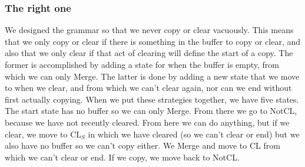 \documentclass[12pt]{article}
\theoremstyle{definition}
\begin{document}









\subsubsection{The right one}
\label{sec:right-one}

We designed the grammar so that we never copy or clear vacuously. This means that we only copy or clear if there is something in the buffer to copy or clear, and also that we only clear if that act of clearing will define the start of a copy. The former is accomplished by adding a state for when the buffer is empty, from which we can only Merge. The latter is done by adding a new state that we move to when we clear, and from which we can't clear again, nor can we end without first actually copying. When we put these strategies together, we have five states. The start state has no buffer so we can only Merge. From there we go to NotCL, because we have not recently cleared. From here we can do anything, but if we clear, we move to CL$_S$ in which we have cleared (so we can't clear or end) but we also have no buffer so we can't copy either. We Merge and move to CL from which we can't clear or end. If we copy, we move back to NotCL.
\end{document}
